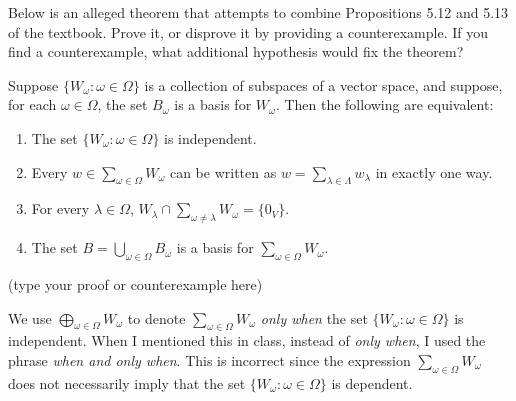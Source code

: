 \probskip

\begin{problem}
Below is an alleged theorem that attempts to combine Propositions 5.12 and 5.13
of the textbook.  Prove it, or disprove it by providing a counterexample.  If
you find a counterexample, what additional hypothesis would fix the theorem?
\begin{prop}
Suppose $\{W_\omega : \omega \in \Omega\}$ is a collection of subspaces of a vector
space, and suppose, for each $\omega \in \Omega$, the set $B_\omega$ is a
basis for $W_\omega$.  Then the following are equivalent: \\[-0.5em]
\begin{enumerate}
\item The set $\{W_\omega : \omega \in \Omega\}$ is independent.\\[-0.5em]
\item Every $w \in \sum_{\omega \in \Omega}W_\omega$ can be written as 
$w  = \sum_{\lambda \in \Lambda}w_\lambda$ in exactly one way.\\[-0.5em]
\item For every $\lambda \in \Omega$, 
$W_\lambda \cap \sum_{\omega \neq\lambda}W_\omega = \{0_V\}$.\\[-0.5em]
\item The set $B = \bigcup_{\omega \in \Omega} B_\omega$ is a basis for 
$\sum_{\omega \in \Omega}W_\omega$.
\end{enumerate}
\end{prop}
\smallskip

(type your proof or counterexample here)
\end{problem}

\probskip

 We use 
$\bigoplus_{\omega \in \Omega} W_\omega$ to denote 
$\sum_{\omega \in \Omega} W_\omega$ \emph{only when} the set
$\{W_\omega : \omega \in \Omega\}$ is independent.  
When I mentioned this in class, instead of \emph{only when}, I used
the phrase \emph{when and only when}. This is incorrect since the expression
$\sum_{\omega \in \Omega} W_\omega$ does not necessarily imply that the set
$\{W_\omega : \omega \in \Omega\}$ is dependent. 




